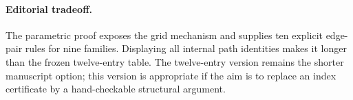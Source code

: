 \paragraph{Editorial tradeoff.}
The parametric proof exposes the grid mechanism and supplies ten
explicit edge-pair rules for nine families. Displaying all internal
path identities makes it longer than the frozen twelve-entry table.
The twelve-entry version remains the shorter manuscript option;
this version is appropriate if the aim is to replace an index
certificate by a hand-checkable structural argument.
